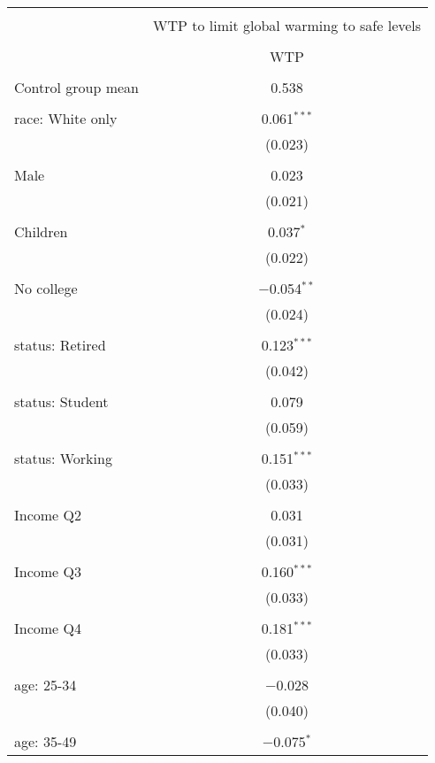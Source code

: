 
\begin{tabular}{@{\extracolsep{5pt}}lc} 
\\[-1.8ex]\hline 
\hline \\[-1.8ex] 
 & \multicolumn{1}{c}{WTP to limit global warming to safe levels} \\ 
\cline{2-2} 
\\[-1.8ex] & WTP \\ 
\hline \\[-1.8ex] 
 Control group mean & 0.538  \\ \hline \\[-1.8ex] race: White only & 0.061$^{***}$ \\ 
  & (0.023) \\ 
  & \\ 
 Male & 0.023 \\ 
  & (0.021) \\ 
  & \\ 
 Children & 0.037$^{*}$ \\ 
  & (0.022) \\ 
  & \\ 
 No college & $-$0.054$^{**}$ \\ 
  & (0.024) \\ 
  & \\ 
 status: Retired & 0.123$^{***}$ \\ 
  & (0.042) \\ 
  & \\ 
 status: Student & 0.079 \\ 
  & (0.059) \\ 
  & \\ 
 status: Working & 0.151$^{***}$ \\ 
  & (0.033) \\ 
  & \\ 
 Income Q2 & 0.031 \\ 
  & (0.031) \\ 
  & \\ 
 Income Q3 & 0.160$^{***}$ \\ 
  & (0.033) \\ 
  & \\ 
 Income Q4 & 0.181$^{***}$ \\ 
  & (0.033) \\ 
  & \\ 
 age: 25-34 & $-$0.028 \\ 
  & (0.040) \\ 
  & \\ 
 age: 35-49 & $-$0.075$^{*}$ \\ 

\end{tabular}
